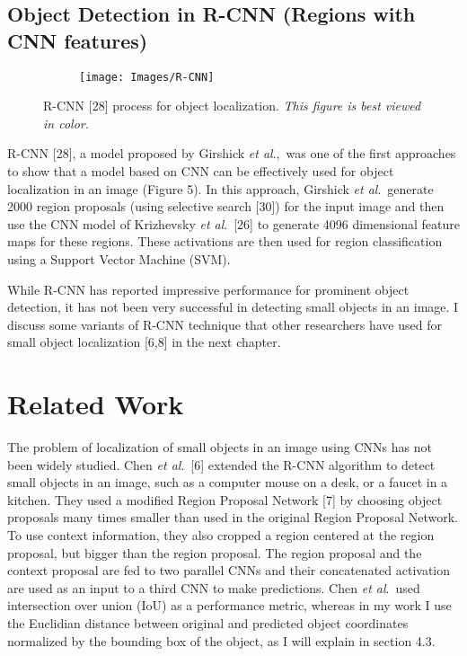 \documentclass [11pt,letterpaper ,twoside ,openany ]{report}
\begin{document}
     \section{Object Detection in R-CNN (Regions with CNN features)}

    \begin{figure}[h]
      \centering
      \begin{subfigure}[b]{0.70\linewidth}
        \texttt{[image: Images/R-CNN]}
      \end{subfigure}
      \caption{R-CNN [28] process for object localization. \textit{This figure is best viewed in color.}}
      \label{fig:r-cnn}
    \end{figure}    

     R-CNN [28], a model proposed by Girshick \textit{et al}.,\ was one of the first approaches to show that a model based on CNN can be effectively used for object localization in an image (Figure 5). In this approach, Girshick \textit{et al}.\ generate 2000 region proposals (using selective search [30]) for the input image and then use the CNN model of Krizhevsky \textit{et al}.\ [26] to generate 4096 dimensional feature maps for these regions. These activations are then used for region classification using a Support Vector Machine (SVM).

     While R-CNN has reported impressive performance for prominent object detection, it has not been very successful in detecting small objects in an image. I discuss some variants of R-CNN technique that other researchers have used for small object localization [6,8] in the next chapter.

    \chapter{Related Work}
    \doublespacing
    The problem of localization of small objects in an image using CNNs has not been widely studied. Chen \textit{et al}.\ [6] extended the R-CNN algorithm to detect small objects in an image, such as a computer mouse on a desk, or a faucet in a kitchen. They used a modified Region Proposal Network [7] by choosing object proposals many times smaller than used in the original Region Proposal Network. To use context information, they also cropped a region centered at the region proposal, but bigger than the region proposal. The region proposal and the context proposal are fed to two parallel CNNs and their concatenated activation are used as an input to a third CNN to make predictions. Chen \textit{et al}.\ used intersection over union (IoU) as a performance metric, whereas in my work I use the Euclidian distance between original and predicted object coordinates normalized by the bounding box of the object, as I will explain in section 4.3. 
\end{document}
